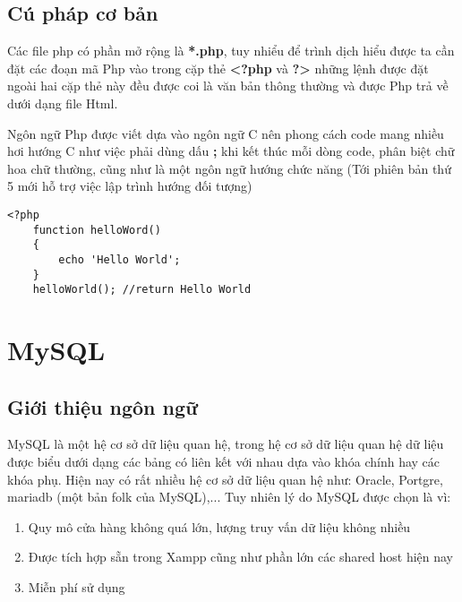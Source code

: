 \subsection{Cú pháp cơ bản}
Các file php có phần mở rộng là \textbf{*.php}, tuy nhiểu để trình dịch hiểu được ta cần đặt các đoạn mã Php vào trong cặp thẻ \textbf{<?php} và \textbf{?>} những lệnh được đặt ngoài hai cặp thẻ này đều được coi là văn bản thông thường và được Php trả về dưới dạng file Html.\par
Ngôn ngữ Php được viết dựa vào ngôn ngữ C nên phong cách code mang nhiều hơi hướng C như việc phải dùng dấu \textbf{;} khi kết thúc mỗi dòng code, phân biệt chữ hoa chữ thường, cũng như là một ngôn ngữ hướng chức năng (Tới phiên bản thứ 5 mới hỗ trợ việc lập trình hướng đối tượng)
\lstset{language=Php}
\begin{center}
\vspace{-2em}
\begin{lstlisting}[frame=single]
<?php
    function helloWord()
    {
        echo 'Hello World';
    }
    helloWorld(); //return Hello World
\end{lstlisting}
\end{center}
\section{MySQL}
\subsection{Giới thiệu ngôn ngữ}
MySQL là một hệ cơ sở dữ liệu quan hệ, trong hệ cơ sở dữ liệu quan hệ dữ liệu được biểu dưới dạng các bảng có liên kết với nhau dựa vào khóa chính hay các khóa phụ. Hiện nay có rất nhiều hệ cơ sở dữ liệu quan hệ như: Oracle, Portgre, mariadb (một bản folk của MySQL),... Tuy nhiên lý do MySQL được chọn là vì:
\begin{enumerate}
\vspace{-1em}
\itemsep0em
\item Quy mô cửa hàng không quá lớn, lượng truy vấn dữ liệu không nhiều
\item Được tích hợp sẵn trong Xampp cũng như phần lớn các shared host hiện nay
\item Miễn phí sử dụng
\end{enumerate}

